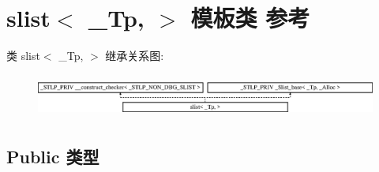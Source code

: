 \hypertarget{classslist}{}\section{slist$<$ \+\_\+\+Tp, $>$ 模板类 参考}
\label{classslist}
类 slist$<$ \+\_\+\+Tp, $>$ 继承关系图\+:\begin{figure}[H]
\begin{center}
\leavevmode
\includegraphics[height=1.454545cm]{classslist}
\end{center}
\end{figure}
\subsection*{Public 类型}
